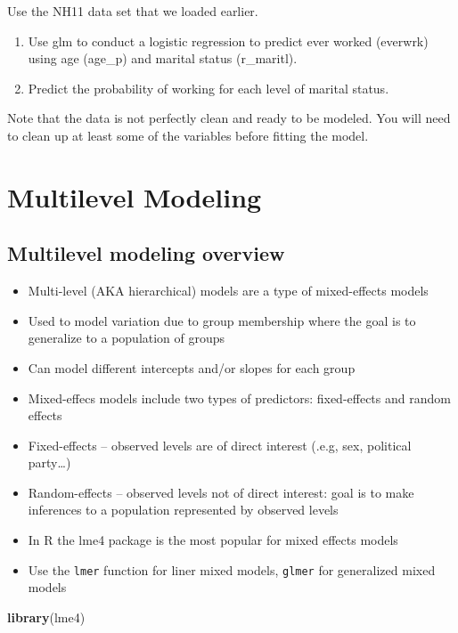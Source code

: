 \documentclass[]{book}
\newenvironment{Shaded}{\begin{snugshade}}{\end{snugshade}}
\newcommand{\KeywordTok}[1]{\textcolor[rgb]{0.13,0.29,0.53}{\textbf{#1}}}
\newcommand{\NormalTok}[1]{#1}
\providecommand{\tightlist}{%
  \setlength{\itemsep}{0pt}\setlength{\parskip}{0pt}}
\begin{document}
Use the NH11 data set that we loaded earlier.

\begin{enumerate}
\def\labelenumi{\arabic{enumi}.}
\tightlist
\item
  Use glm to conduct a logistic regression to predict ever worked
  (everwrk) using age (age\_p) and marital status (r\_maritl).
\item
  Predict the probability of working for each level of marital status.
\end{enumerate}

Note that the data is not perfectly clean and ready to be modeled. You
will need to clean up at least some of the variables before fitting the
model.

\section{Multilevel Modeling}\label{multilevel-modeling}

\subsection{Multilevel modeling
overview}\label{multilevel-modeling-overview}

\begin{itemize}
\tightlist
\item
  Multi-level (AKA hierarchical) models are a type of mixed-effects
  models
\item
  Used to model variation due to group membership where the goal is to
  generalize to a population of groups
\item
  Can model different intercepts and/or slopes for each group
\item
  Mixed-effecs models include two types of predictors: fixed-effects and
  random effects
\item
  Fixed-effects -- observed levels are of direct interest (.e.g, sex,
  political party\ldots{})
\item
  Random-effects -- observed levels not of direct interest: goal is to
  make inferences to a population represented by observed levels
\item
  In R the lme4 package is the most popular for mixed effects models
\item
  Use the \texttt{lmer} function for liner mixed models, \texttt{glmer}
  for generalized mixed models
\end{itemize}

\begin{Shaded}
\begin{Highlighting}[]
  \KeywordTok{library}\NormalTok{(lme4)}
\end{Highlighting}
\end{Shaded}
\end{document}
